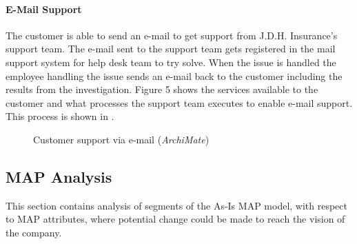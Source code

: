 \paragraph{E-Mail Support}
\label{sec:mail_support}
The customer is able to send an e-mail to get support from J.D.H. Insurance's support team. The e-mail sent to the support team gets registered in the mail support system for help desk team to try solve. When the issue is handled the employee handling the issue sends an e-mail back to the customer including the results from the investigation. Figure 5 shows the services available to the customer and what processes the support team executes to enable e-mail support. This process is shown in .
\begin{center}
	\begin{figure}[H]
		\centering
		\setlength\fboxsep{7pt}
		\setlength\fboxrule{0.5pt}
		\caption{Customer support via e-mail (\emph{ArchiMate})}
		\label{fig:archi_mail}
	\end{figure}
\end{center}
%

\subsection{MAP Analysis}
\label{sec:map_analysis}
This section contains analysis of segments of the As-Is MAP model, with respect to MAP attributes, where potential change could be made to reach the vision of the company.

